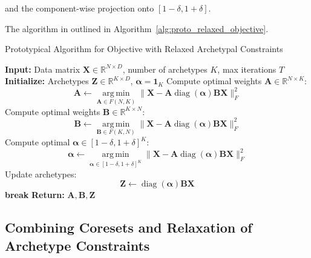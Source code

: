 \documentclass[oneside]{article}
\begin{document}
and the component-wise projection onto $[1-\delta, 1+\delta]$.

The algorithm in outlined in Algorithm~\ref{alg:proto_relaxed_objective}.

\begin{algorithm}[H]
    \caption{Prototypical Algorithm for Objective with Relaxed Archetypal Constraints}
    \label{alg:proto_relaxed_objective}
    \begin{algorithmic}[1]
    \State \textbf{Input:} Data matrix $\mathbf{X} \in \mathbb{R}^{N \times D}$, number of archetypes $K$, max iterations $T$
    \State \textbf{Initialize:} Archetypes $\mathbf{Z} \in \mathbb{R}^{K \times D}$, $\boldsymbol{\alpha} = \mathbf{1}_K$
        \State Compute optimal weights $\mathbf{A} \in \mathbb{R}^{N \times K}$:
        \begin{equation}
        \mathbf{A} \gets \operatorname*{arg\,min}_{\mathbf{A} \in F(N, K)} \| {\mathbf{X}} - {\mathbf{A}} \operatorname{diag}(\boldsymbol{\alpha}) \mathbf{B} \mathbf{X} \|_F^2
        \end{equation}
        \State Compute optimal weights $\mathbf{B} \in \mathbb{R}^{K \times N}$:
        \begin{equation}
        \mathbf{B} \gets \operatorname*{arg\,min}_{\mathbf{B} \in F(K, N)} \| {\mathbf{X}} - {\mathbf{A}} \operatorname{diag}(\boldsymbol{\alpha}) \mathbf{B} \mathbf{X} \|_F^2
        \end{equation}
        \State Compute optimal $\boldsymbol{\alpha} \in [1-\delta, 1+\delta]^K$:
        \begin{equation}
        \boldsymbol{\alpha} \gets \operatorname*{arg\,min}_{\boldsymbol{\alpha} \in [1-\delta, 1+\delta]^K} \| {\mathbf{X}} - {\mathbf{A}} \operatorname{diag}(\boldsymbol{\alpha}) \mathbf{B} \mathbf{X} \|_F^2
        \end{equation}
        \State Update archetypes:
        \begin{equation}
        \mathbf{Z} \gets \operatorname{diag}(\boldsymbol{\alpha}) \mathbf{B} \mathbf{X}
        \end{equation}
            \State \textbf{break}
        \EndIf
    \EndFor
    \State \textbf{Return:} $\mathbf{A}, \mathbf{B}, \mathbf{Z}$
    \end{algorithmic}
\end{algorithm}

\subsection{Combining Coresets and Relaxation of Archetype Constraints}
\end{document}
